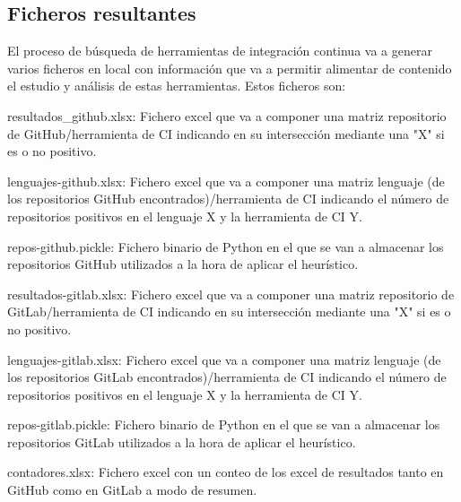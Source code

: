 \subsection{Ficheros resultantes}
El proceso de búsqueda de herramientas de integración continua va a generar varios ficheros en local con información que va a permitir alimentar de contenido el estudio y análisis de estas herramientas. Estos ficheros son:
\begin{compactitem}
    \item resultados\_github.xlsx: Fichero excel que va a componer una matriz repositorio de GitHub/herramienta de CI indicando en su intersección mediante una "X" si es o no positivo.
    \item lenguajes-github.xlsx: Fichero excel que va a componer una matriz lenguaje (de los repositorios GitHub encontrados)/herramienta de CI indicando el número de repositorios positivos en el lenguaje X y la herramienta de CI Y.
    \item repos-github.pickle: Fichero binario de Python en el que se van a almacenar los repositorios GitHub utilizados a la hora de aplicar el heurístico.
    \item resultados-gitlab.xlsx: Fichero excel que va a componer una matriz repositorio de GitLab/herramienta de CI indicando en su intersección mediante una "X" si es o no positivo.
    \item lenguajes-gitlab.xlsx: Fichero excel que va a componer una matriz lenguaje (de los repositorios GitLab encontrados)/herramienta de CI indicando el número de repositorios positivos en el lenguaje X y la herramienta de CI Y.
    \item repos-gitlab.pickle: Fichero binario de Python en el que se van a almacenar los repositorios GitLab utilizados a la hora de aplicar el heurístico.
    \item contadores.xlsx: Fichero excel con un conteo de los excel de resultados tanto en GitHub como en GitLab a modo de resumen.
\end{compactitem}

